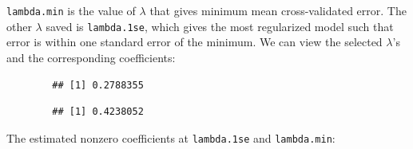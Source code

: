 \texttt{lambda.min} is the value of $\lambda$ that gives minimum mean cross-validated error. The other $\lambda$ saved is \texttt{lambda.1se},
which gives the most regularized model such that error is within one standard error of the minimum. We can view the selected $\lambda$'s and the corresponding coefficients:

\begin{knitrout}\scriptsize
	\color{fgcolor}\begin{kframe}
		\begin{alltt}
			\hlstd{cvfit[[}\hlstd{]]}
		\end{alltt}
		\begin{verbatim}
		## [1] 0.2788355
		\end{verbatim}
		\begin{alltt}
			\hlstd{cvfit[[}\hlstd{]]}
		\end{alltt}
		\begin{verbatim}
		## [1] 0.4238052
		\end{verbatim}
	\end{kframe}
\end{knitrout}

The estimated nonzero coefficients at \texttt{lambda.1se} and \texttt{lambda.min}:

